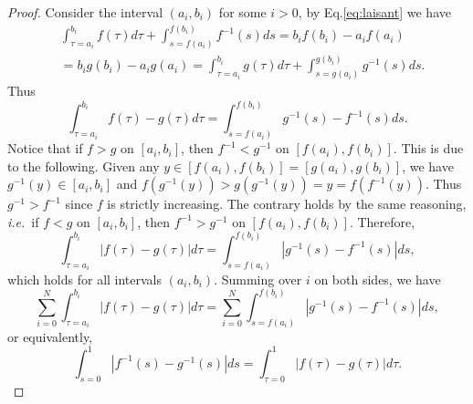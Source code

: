 \documentclass[letterpaper]{article}
\newcommand{\ie}{\emph{i.e.}}
\theoremstyle{definition}
\begin{document}
\begin{proof}
Consider the interval $(a_i, b_i)$ for some $i>0$, by Eq.\ref{eq:laisant} we have 
\begin{align*}
    &\int_{\tau=a_i}^{b_i} f(\tau)d\tau + \int_{s=f(a_i)}^{f(b_i)} f^{-1}(s)ds = b_i f(b_i)- a_i f(a_i) \\
    &= b_i g(b_i)- a_i g(a_i) = \int_{\tau=a_i}^{b_i} g(\tau)d\tau + \int_{s=g(a_i)}^{g(b_i)} g^{-1}(s)ds.
\end{align*}
Thus \[
\int_{\tau=a_i}^{b_i} f(\tau) - g(\tau) d\tau = \int_{s=f(a_i)}^{f(b_i)} g^{-1}(s)-f^{-1}(s)ds.
\]
Notice that if $f > g$ on $[a_i, b_i]$, then $f^{-1} < g^{-1}$ on $[f(a_i), f(b_i)]$. This is due to the following. Given any $y\in [f(a_i), f(b_i)]=[g(a_i), g(b_i)]$, we have $g^{-1}(y)\in[a_i, b_i]$ and $f(g^{-1}(y))> g(g^{-1}(y)) = y = f(f^{-1}(y))$. Thus $g^{-1} > f^{-1}$ since $f$ is strictly increasing. The contrary holds by the same reasoning, \ie~if $f < g$ on $[a_i, b_i]$, then $f^{-1} > g^{-1}$ on $[f(a_i), f(b_i)]$. Therefore, 
\[
\int_{\tau=a_i}^{b_i} |f(\tau) - g(\tau)| d\tau = \int_{s=f(a_i)}^{f(b_i)} |g^{-1}(s)-f^{-1}(s)| ds,
\]
which holds for all intervals $(a_i, b_i)$. Summing over $i$ on both sides, we have
 \[
 \sum_{i=0}^N \int_{\tau=a_i}^{b_i} |f(\tau) - g(\tau)| d\tau =  \sum_{i=0}^N \int_{s=f(a_i)}^{f(b_i)} |g^{-1}(s)-f^{-1}(s)| ds,
 \]
 or equivalently, 
 \[
 \int_{s=0}^1 |f^{-1}(s) - g^{-1}(s)|ds = \int_{\tau=0}^1 |f(\tau) - g(\tau)|d\tau.
 \]
\end{proof}
\end{document}
